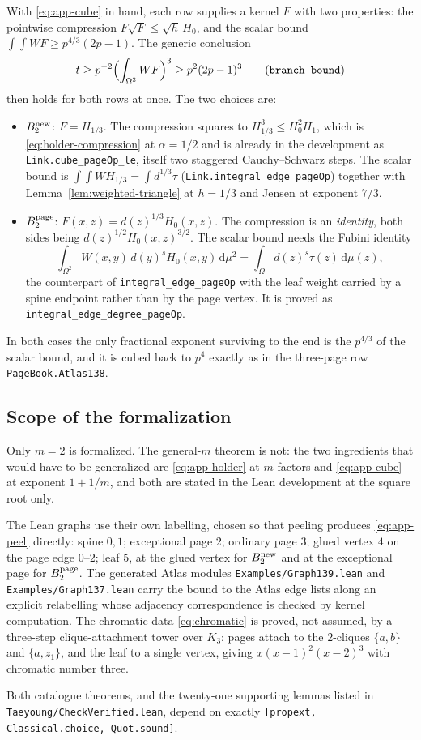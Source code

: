 \documentclass[11pt]{article}
\newcommand{\dd}{\,\mathrm d}
\begin{document}
With \eqref{eq:app-cube} in hand, each row supplies a kernel $F$ with two
properties: the pointwise compression $F\sqrt F\leq\sqrt h\,H_0$, and the
scalar bound $\int\!\!\int WF\geq p^{4/3}(2p-1)$.  The generic conclusion
\[
 t\geq p^{-2}\Bigl(\int_{\Omega^2}WF\Bigr)^{3}\geq p^2(2p-1)^3
 \qquad\text{(\texttt{branch\_bound})}
\]
then holds for both rows at once.  The two choices are:
\begin{itemize}
 \item $B_2^{\rm new}$: $F=H_{1/3}$.  The compression squares to
 $H_{1/3}^3\leq H_0^2H_1$, which is \eqref{eq:holder-compression} at
 $\alpha=1/2$ and is already in the development as
 \texttt{Link.cube\_pageOp\_le}, itself two staggered Cauchy--Schwarz steps.
 The scalar bound is $\int\!\!\int WH_{1/3}=\int d^{1/3}\tau$
 (\texttt{Link.integral\_edge\_pageOp}) together with
 Lemma~\ref{lem:weighted-triangle} at $h=1/3$ and Jensen at exponent $7/3$.
 \item $B_2^{\rm page}$: $F(x,z)=d(z)^{1/3}H_0(x,z)$.  The compression is an
 \emph{identity}, both sides being $d(z)^{1/2}H_0(x,z)^{3/2}$.  The scalar
 bound needs the Fubini identity
 \[
  \int_{\Omega^2}W(x,y)\,d(y)^{s}H_0(x,y)\dd\mu^2=\int_\Omega d(z)^s\tau(z)\dd\mu(z),
 \]
 the counterpart of \texttt{integral\_edge\_pageOp} with the leaf weight
 carried by a spine endpoint rather than by the page vertex.  It is proved as
 \texttt{integral\_edge\_degree\_pageOp}.
\end{itemize}
In both cases the only fractional exponent surviving to the end is the
$p^{4/3}$ of the scalar bound, and it is cubed back to $p^4$ exactly as in the
three-page row \texttt{PageBook.Atlas138}.


\subsection{Scope of the formalization}
\label{sec:app-scope}

Only $m=2$ is formalized.  The general-$m$ theorem is not: the two ingredients
that would have to be generalized are \eqref{eq:app-holder} at $m$ factors and
\eqref{eq:app-cube} at exponent $1+1/m$, and both are stated in the Lean
development at the square root only.

The Lean graphs use their own labelling, chosen so that peeling produces
\eqref{eq:app-peel} directly: spine $0,1$; exceptional page $2$; ordinary page
$3$; glued vertex $4$ on the page edge $0$--$2$; leaf $5$, at the glued vertex
for $B_2^{\rm new}$ and at the exceptional page for $B_2^{\rm page}$.  The
generated Atlas modules \texttt{Examples/Graph139.lean} and
\texttt{Examples/Graph137.lean} carry the bound to the Atlas edge lists along
an explicit relabelling whose adjacency correspondence is checked by kernel
computation.  The chromatic data \eqref{eq:chromatic} is proved, not assumed,
by a three-step clique-attachment tower over $K_3$: pages attach to the
$2$-cliques $\{a,b\}$ and $\{a,z_1\}$, and the leaf to a single vertex, giving
$x(x-1)^2(x-2)^3$ with chromatic number three.

Both catalogue theorems, and the twenty-one supporting lemmas listed in
\texttt{Taeyoung/CheckVerified.lean}, depend on exactly
\texttt{[propext, Classical.choice, Quot.sound]}.
\end{document}
